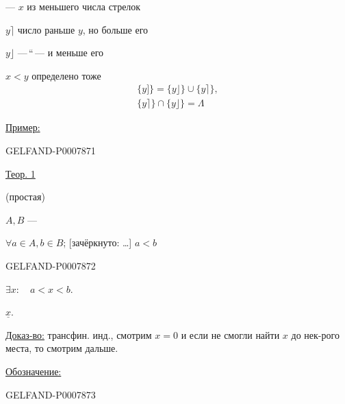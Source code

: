  --- \(x\) из меньшего числа стрелок

\(y\rceil\) число раньше \(y\), но больше его

\(y\rfloor\) ---\,\textquotedblleft\,--- и меньше его

\(x<y\) определено тоже
\begin{gather*}
\{y]\}=\{y\rfloor\}\cup\{y\rceil\},\\
\{y\rceil\}\cap\{y\rfloor\}=\Lambda
\end{gather*}

\underline{Пример:}



\begin{GelfandAdjacentEvidence}{GELFAND-P000787}{1}

\underline{Теор. 1}

(простая)

\(A,B\) --- 

\(\forall a\in A,b\in B\); [зачёркнуто: \ldots{}] \(a<b\)
\end{GelfandAdjacentEvidence}
\begin{GelfandAdjacentEvidence}{GELFAND-P000787}{2}


 \(\exists x:\quad a<x<b.\)

 \(\underline{x}\).

\underline{Доказ-во:} трансфин. инд., смотрим \(x=0\) и если не смогли найти \(x\) до нек-рого места, то смотрим дальше.

\underline{Обозначение:}

\end{GelfandAdjacentEvidence}
\begin{GelfandAdjacentEvidence}{GELFAND-P000787}{3}

\end{GelfandAdjacentEvidence}
